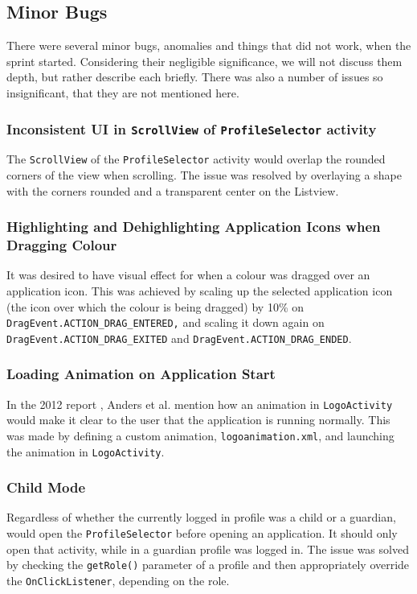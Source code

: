 \subsection{Minor Bugs}

There were several minor bugs, anomalies and things that did not work, when the sprint started.
Considering their negligible significance, we will not discuss them depth, but rather describe each briefly.
There was also a number of issues so insignificant, that they are not mentioned here.

\subsubsection*{Inconsistent UI in \lstinline{ScrollView} of \lstinline{ProfileSelector} activity}
The \lstinline{ScrollView} of the \lstinline{ProfileSelector} activity would overlap the rounded corners of the view when scrolling.
The issue was resolved by overlaying a shape with the corners rounded and a transparent center on the Listview.

\subsubsection*{Highlighting and Dehighlighting Application Icons when Dragging Colour}
It was desired to have visual effect for when a colour was dragged over an application icon.
This was achieved by scaling up the selected application icon (the icon over which the colour is being dragged) by 10\% on \lstinline{DragEvent.ACTION_DRAG_ENTERED,} and scaling it down again on \lstinline{DragEvent.ACTION_DRAG_EXITED} and \lstinline{DragEvent.ACTION_DRAG_ENDED}.

\subsubsection*{Loading Animation on Application Start}
In the 2012 report \cite{launcher2012}, Anders et al. mention how an animation in \lstinline{LogoActivity} would make it clear to the user that the application is running normally.
This was made by defining a custom animation, \lstinline{logoanimation.xml}, and launching the animation in \lstinline{LogoActivity}.

\subsubsection*{Child Mode}
Regardless of whether the currently logged in profile was a child or a guardian, \launcher would open the \lstinline{ProfileSelector} before opening an application.
It should only open that activity, while in a guardian profile was logged in.
The issue was solved by checking the \lstinline{getRole()} parameter of a profile and then appropriately override the \lstinline{OnClickListener}, depending on the role. 

